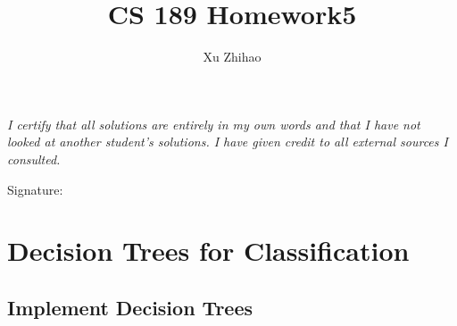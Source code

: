 \documentclass[a4paper,12pt]{article}
\title{CS 189 Homework5}
\author{Xu Zhihao}
\begin{document}
\pagestyle{fancy}{}
\fancyhf{} 
\rhead{\thepage \  / \pageref{LastPage}}

\maketitle

\emph{I certify that all solutions are entirely in my own words and that I have not looked at another student’s solutions. I have given credit to all external sources I consulted.} 
\begin{flushright}
Signature: \quad \quad \quad \quad \quad \quad \quad \quad \quad \quad \quad
\end{flushright}
\vspace{100pt}

\tableofcontents

\clearpage
\section{Decision Trees for Classification}

\subsection{Implement Decision Trees}
\end{document}
